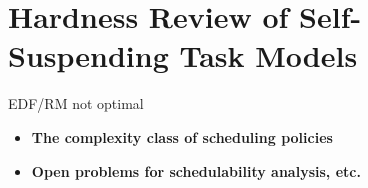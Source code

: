\section{Hardness Review of Self-Suspending Task Models}
   EDF/RM not optimal \cite{Ridouard_2004} 
   
\begin{itemize}
\item \textbf{The complexity class of scheduling policies}
\item \textbf{Open problems for schedulability analysis, etc.}
\end{itemize}
  
  